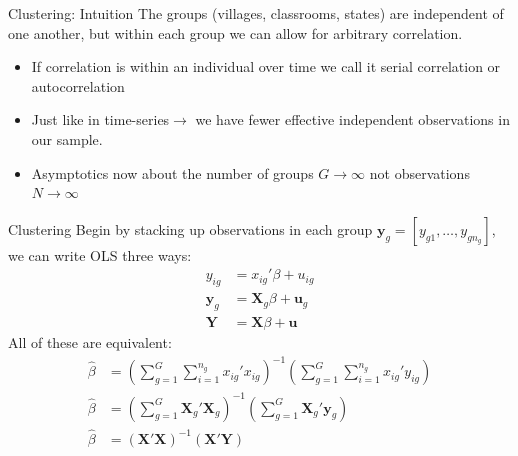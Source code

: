 \documentclass[aspectratio=169]{beamer}
\begin{document}
\begin{frame}{Clustering: Intuition}
The groups (villages, classrooms, states) are independent of one another, but within each group we can allow for arbitrary correlation.
\begin{itemize}
\item If correlation is within an individual over time we call it \alert{serial correlation} or \alert{autocorrelation}
\item Just like in time-series$\rightarrow$ we have fewer effective independent observations in our sample.
\item Asymptotics now about the number of groups $G \rightarrow \infty$ not observations $N \rightarrow \infty$
\end{itemize}
\end{frame}

\begin{frame}{Clustering}
Begin by stacking up observations in each group $\mathbf{y}_{g }  = [y_{g1},\ldots,y_{g n_g}]$, we can write OLS three ways:
\begin{align*}
y_{ig } &= x_{ig}' \beta + u_{ig}\\
\mathbf{y}_{g } &= \mathbf{X}_{g} \beta + \mathbf{u}_{g}\\
\mathbf{Y} &= \mathbf{X} \beta + \mathbf{u}
\end{align*}
All of these are equivalent:
\begin{align*}
\widehat {  \beta  } &= \left( \sum _ { g = 1 } ^ { G } \sum _ { i = 1 } ^ { n _ { g } } x _ { i g }' { x } _ { i g } \right) ^ { - 1 } \left( \sum _ { g = 1 } ^ { G } \sum _ { i = 1 } ^ { n _ { g } } x _ { i g }' y _ { i g } \right)\\
\widehat {  \beta  }  &=  \left(  \sum _ { g = 1 } ^ { G } \mathbf{X}_g' \mathbf{X}_g \right)^{-1} \left(  \sum _ { g = 1 } ^ { G } \mathbf{X}_g' \mathbf{y}_g \right)\\
\widehat {  \beta  }  &=  \left( \mathbf{X}' \mathbf{X} \right)^{-1} \left(   \mathbf{X}' \mathbf{Y} \right)\\
\end{align*}
\end{frame}
\end{document}
